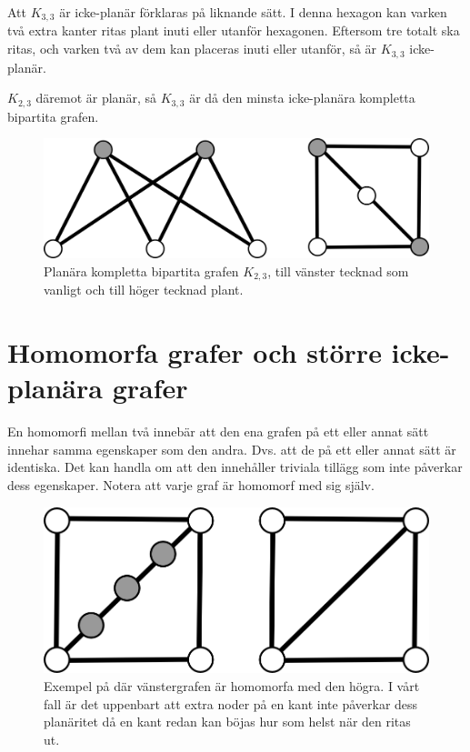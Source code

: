\documentclass[a4paper,11pt]{article}
\begin{document}
Att $K_{3,3}$ är icke-planär förklaras på liknande sätt. I denna hexagon kan varken två extra kanter ritas plant inuti eller utanför hexagonen. Eftersom tre totalt ska ritas, och varken två av dem kan placeras inuti eller utanför, så är $K_{3,3}$ icke-planär.

$K_{2,3}$ däremot är planär, så $K_{3,3}$ är då den minsta icke-planära kompletta bipartita grafen.

\begin{figure}[!ht]
	\begin{center}
		\includegraphics{fig7}
		\caption{Planära kompletta bipartita grafen $K_{2,3}$, till vänster tecknad som vanligt och till höger tecknad plant.}
		\label{fig7}
	\end{center}
\end{figure}
\FloatBarrier

\section*{Homomorfa grafer och större icke-planära grafer}

En homomorfi mellan två innebär att den ena grafen på ett eller annat sätt innehar samma egenskaper som den andra. Dvs. att de på ett eller annat sätt är identiska. Det kan handla om att den innehåller triviala tillägg som inte påverkar dess egenskaper. Notera att varje graf är homomorf med sig själv.

\begin{figure}[!ht]
	\begin{center}
		\includegraphics{fig8}
		\caption{Exempel på där vänstergrafen är homomorfa med den högra. I vårt fall är det uppenbart att extra noder på en kant inte påverkar dess planäritet då en kant redan kan böjas hur som helst när den ritas ut.}
		\label{fig8}
	\end{center}
\end{figure}
\FloatBarrier
\end{document}
